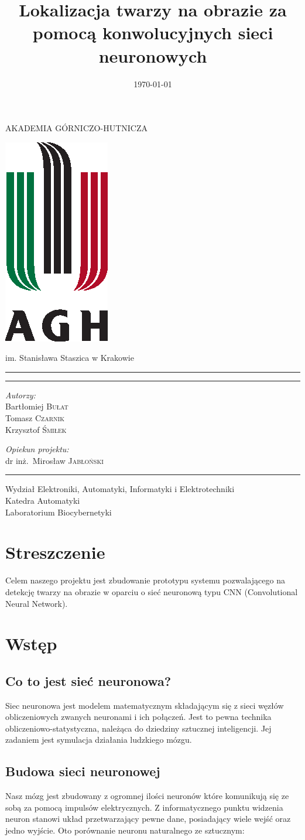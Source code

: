 \documentclass[11pt,a4paper]{article}
\title{Lokalizacja twarzy na obrazie za pomocą konwolucyjnych sieci neuronowych}
\date{\today}
\makeatletter
\renewcommand{\maketitle}{
\begin{titlepage}
\begin{center}

\LARGE{AKADEMIA GÓRNICZO-HUTNICZA}

\vspace*{1cm}
\includegraphics[scale=1.8]{agh.eps}
\vspace*{1cm}

\LARGE{im. Stanisława Staszica w Krakowie}

\rule{\textwidth}{0.4mm}
\LARGE \textsc{\@title}
\rule{\textwidth}{0.4mm}

\vspace*{5mm}

\begin{minipage}{0.4\textwidth}
\begin{flushleft} \large
\emph{Autorzy:}\\
Bartłomiej \textsc{Bułat}\\
Tomasz \textsc{Czarnik}\\
Krzysztof \textsc{Śmiłek}\\
\end{flushleft}
\end{minipage}
\begin{minipage}{0.4\textwidth}
\begin{flushright} \large
\emph{Opiekun projektu:} \\
dr inż.~Mirosław \textsc{Jabłoński}
\end{flushright}
\end{minipage}
\vfill
\vspace*{\stretch{8}}
\rule{\textwidth}{0.4mm}

\large{Wydział Elektroniki, Automatyki, Informatyki i Elektrotechniki}\\
\large{Katedra Automatyki}\\
\large{Laboratorium Biocybernetyki}\\
\vspace*{\stretch{7}}
\@date

\end{center}

\end{titlepage}
}
\makeatother
\begin{document}
\maketitle

\newpage

\tableofcontents

\newpage

\section{Streszczenie}

Celem naszego projektu jest zbudowanie prototypu systemu pozwalającego na detekcję twarzy na obrazie 
w oparciu o sieć neuronową typu CNN (Convolutional Neural Network).
\section{Wstęp}

\subsection{Co to jest sieć neuronowa?}
Siec neuronowa jest modelem matematycznym składającym się z sieci węzłów obliczeniowych zwanych neuronami
 i ich połączeń. Jest to pewna technika obliczeniowo-statystyczna, należąca do dziedziny sztucznej inteligencji. 
Jej zadaniem jest symulacja działania ludzkiego mózgu. 

\subsection{Budowa sieci neuronowej}
Nasz mózg jest zbudowany z ogromnej ilości neuronów które komunikują się ze sobą za pomocą impulsów elektrycznych.
 Z informatycznego punktu widzenia neuron stanowi układ przetwarzający pewne dane, posiadający wiele wejść
 oraz jedno wyjście. Oto porównanie neuronu naturalnego ze sztucznym:
\end{document}
